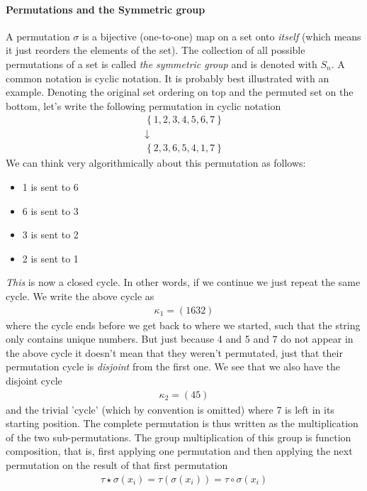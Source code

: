\paragraph{Permutations and the Symmetric group}
A permutation \(\sigma\) is a bijective (one-to-one) map on a set onto \textit{itself} (which means it just reorders the elements of the set). The collection of all possible permutations of a set is called \textit{the symmetric group} and is denoted with \(S_n\). A common notation is cyclic notation. It is probably best illustrated with an example. Denoting the original set ordering on top and the permuted set on the bottom, let's write the following permutation in cyclic notation\begin{gather*}
    \left\{ 1, 2, 3, 4, 5, 6, 7 \right\} \\
    \downarrow\\
    \left\{ 2, 3, 6, 5, 4, 1, 7\right\}
\end{gather*}  
We can think very algorithmically about this permutation as follows:
\begin{itemize}
    \item 1 is sent to 6
    \item 6 is sent to 3
    \item 3 is sent to 2
    \item 2 is sent to 1
\end{itemize}
\textit{This} is now a closed cycle. In other words, if we continue we just repeat the same cycle. We write the above cycle as \begin{align*}
    \kappa _1 = (1632)
\end{align*}
where the cycle ends before we get back to where we started, such that the string only contains unique numbers. But just because 4 and 5 and 7 do not appear in the above cycle it doesn't mean that they weren't permutated, just that their permutation cycle is \textit{disjoint} from the first one. We see that we also have the disjoint cycle \begin{align*}
    \kappa _2 = (45)
\end{align*}
and the trivial 'cycle' (which by convention is omitted) where 7 is left in its starting position. The complete permutation is thus written as the multiplication of the two sub-permutations. The group multiplication of this group is function composition, that is, first applying one permutation and then applying the next permutation on the result of that first permutation\begin{align*}
    \tau \star \sigma (x_i) = \tau (\sigma (x_i)) = \tau \circ \sigma (x_i)
\end{align*}
